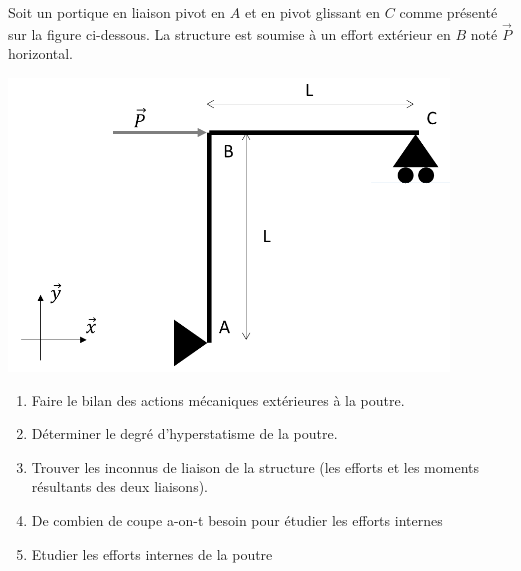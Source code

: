 \documentclass[lecture.tex]{subfiles}
\begin{document}
\exercice{}



Soit un portique en liaison pivot en $A$ et en pivot glissant en $C$ comme présenté sur la figure ci-dessous. La structure est soumise à un effort extérieur en $B$ noté $\vec{P}$ horizontal.

\begin{center}
  \includegraphics[scale=0.5]{exo-portique-en-appuie.png}
\end{center}

\begin{enumerate}
  \item Faire le bilan des actions mécaniques extérieures à la poutre.
  \item Déterminer le degré d’hyperstatisme de la poutre.
  \item Trouver les inconnus de liaison de la structure (les efforts et les moments résultants des deux liaisons).
  \item De combien de coupe a-on-t besoin pour étudier les efforts internes
  \item Etudier les efforts internes de la poutre
\end{enumerate}

\finexercice
\end{document}

